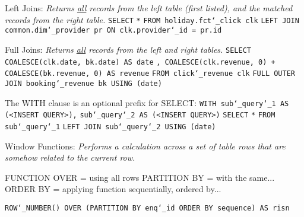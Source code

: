 \vspace{\baselineskip}
Left Joins:\newline
\textit{Returns \underline{all} records from the left table (first listed), and the matched records from the right table.}\newline
\texttt{SELECT}\newline
\texttt{*}\newline
\texttt{FROM holiday.fct\char`_click clk}\newline
\texttt{LEFT JOIN common.dim\char`_provider pr ON clk.provider\char`_id = pr.id}

\vspace{\baselineskip}
Full Joins:\newline
\textit{Returns \underline{all} records from the left and right tables.}\newline
\texttt{SELECT}\newline
\texttt{COALESCE(clk.date, bk.date) AS date}\newline
\texttt{, COALESCE(clk.revenue, 0) + COALESCE(bk.revenue, 0) AS revenue}\newline
\texttt{FROM click\char`_revenue clk}\newline
\texttt{FULL OUTER JOIN booking\char`_revenue bk USING (date)}

\vspace{\baselineskip}
The WITH clause is an optional prefix for SELECT:\newline
\texttt{WITH sub\char`_query\char`_1 AS (<INSERT QUERY>),}\newline
\texttt{sub\char`_query\char`_2 AS (<INSERT QUERY>)}\newline\newline
\texttt{SELECT}\newline
\texttt{*}\newline
\texttt{FROM sub\char`_query\char`_1}\newline
\texttt{LEFT JOIN sub\char`_query\char`_2 USING (date)}

\newpage

Window Functions:\newline
\textit{Performs a calculation across a set of table rows that are somehow related to the current row.}

FUNCTION\newline
OVER = using all rows\newline
PARTITION BY = with the same...\newline
ORDER BY = applying function sequentially, ordered by...

\texttt{ROW\char`_NUMBER() OVER (PARTITION BY enq\char`_id ORDER BY sequence) AS risn}

\newpage